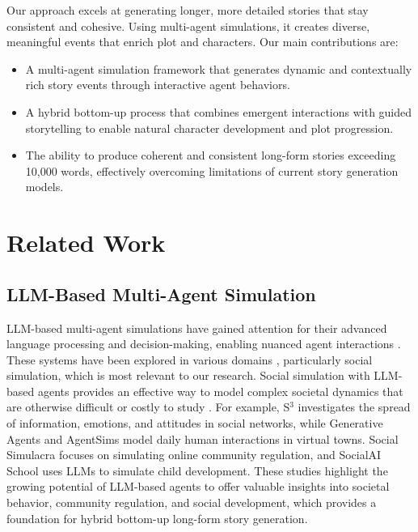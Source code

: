\documentclass[letterpaper]{article} %
\begin{document}
Our approach excels at generating longer, more detailed stories that stay consistent and cohesive. Using multi-agent simulations, it creates diverse, meaningful events that enrich plot and characters. Our main contributions are:

\begin{itemize}
  \item A multi-agent simulation framework that generates dynamic and contextually rich story events through interactive agent behaviors.
  
  \item A hybrid bottom-up process that combines emergent interactions with guided storytelling to enable natural character development and plot progression.
  
  \item The ability to produce coherent and consistent long-form stories exceeding 10,000 words, effectively overcoming limitations of current story generation models.
\end{itemize}

\section{Related Work}

\subsection{LLM-Based Multi-Agent Simulation}

LLM-based multi-agent simulations have gained attention for their advanced language processing and decision-making, enabling nuanced agent interactions \cite{jinxin2023cgmi, liu2023training, feng2023role}. These systems have been explored in various domains \cite{wang2024survey, williams2023epidemic}, particularly social simulation, which is most relevant to our research. Social simulation with LLM-based agents provides an effective way to model complex societal dynamics that are otherwise difficult or costly to study \cite{li2023you, li2023quantifying}. For example, S$^3$ \cite{gao2023s} investigates the spread of information, emotions, and attitudes in social networks, while Generative Agents \cite{park2023generative} and AgentSims \cite{lin2023agentsims} model daily human interactions in virtual towns. Social Simulacra \cite{park2022social} focuses on simulating online community regulation, and SocialAI School \cite{kovavc2023socialai} uses LLMs to simulate child development. These studies highlight the growing potential of LLM-based agents to offer valuable insights into societal behavior, community regulation, and social development, which provides a foundation for hybrid bottom-up long-form story generation.
\end{document}
